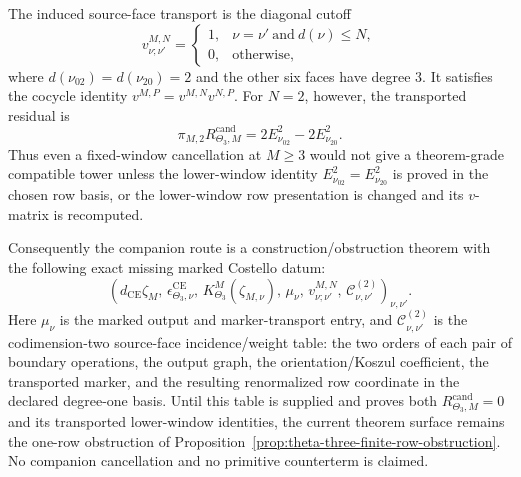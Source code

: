 \begin{thm}
  The induced source-face transport is the diagonal cutoff
  \[
    v^{M,N}_{\nu;\nu'}
      =
    \begin{cases}
      1,&\nu=\nu'\ \text{and}\ d(\nu)\leq N,\\
      0,&\text{otherwise},
    \end{cases}
  \]
  where \(d(\nu_{02})=d(\nu_{20})=2\) and the other six faces have
  degree \(3\).  It satisfies the cocycle identity
  \(v^{M,P}=v^{M,N}v^{N,P}\).  For \(N=2\), however, the transported
  residual is
  \[
    \pi_{M,2}R^{\mathrm{cand}}_{\Theta_3,M}
      =
    2E^2_{\nu_{02}}-2E^2_{\nu_{20}}.
  \]
  Thus even a fixed-window cancellation at \(M\geq3\) would not give a
  theorem-grade compatible tower unless the lower-window identity
  \(E^2_{\nu_{02}}=E^2_{\nu_{20}}\) is proved in the chosen row basis, or
  the lower-window row presentation is changed and its \(v\)-matrix is
  recomputed.

  Consequently the companion route is a construction/obstruction theorem
  with the following exact missing marked Costello datum:
  \[
    \left(
      d_{\mathrm{CE}}\zeta_M,\,
      \epsilon^{\mathrm{CE}}_{\Theta_3,\nu},\,
      K^M_{\Theta_3}(\zeta_{M,\nu}),\,
      \mu_\nu,\,
      v^{M,N}_{\nu;\nu'},\,
      \mathcal C^{(2)}_{\nu,\nu'}
    \right)_{\nu,\nu'} .
  \]
  Here \(\mu_\nu\) is the marked output and marker-transport entry, and
  \(\mathcal C^{(2)}_{\nu,\nu'}\) is the codimension-two source-face
  incidence/weight table: the two orders of each pair of boundary
  operations, the output graph, the orientation/Koszul coefficient, the
  transported marker, and the resulting renormalized row coordinate in the
  declared degree-one basis.  Until this table is supplied and proves both
  \(R^{\mathrm{cand}}_{\Theta_3,M}=0\) and its transported lower-window
  identities, the current theorem surface remains the one-row obstruction
  of Proposition~\ref{prop:theta-three-finite-row-obstruction}.  No
  companion cancellation and no primitive counterterm is claimed.
\end{thm}

